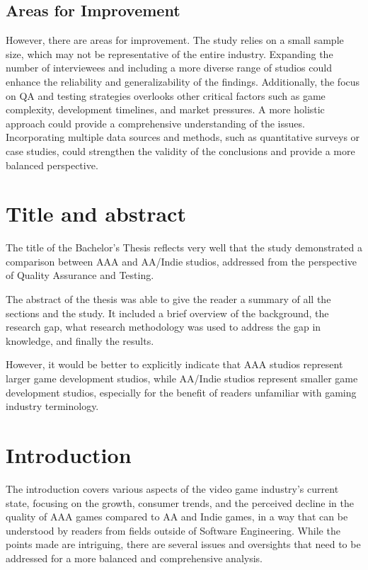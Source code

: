 \documentclass[conference]{IEEEtran}
\begin{document}
\subsection{Areas for Improvement}
However, there are areas for improvement. The study relies on a small sample size, which may not be representative of the entire industry. Expanding the number of interviewees and including a more diverse range of studios could enhance the reliability and generalizability of the findings. Additionally, the focus on QA and testing strategies overlooks other critical factors such as game complexity, development timelines, and market pressures. A more holistic approach could provide a comprehensive understanding of the issues. Incorporating multiple data sources and methods, such as quantitative surveys or case studies, could strengthen the validity of the conclusions and provide a more balanced perspective.


\section{Title and abstract}
The title of the Bachelor's Thesis reflects very well that the study demonstrated a comparison between AAA and AA/Indie studios, addressed from the perspective of Quality Assurance and Testing.

The abstract of the thesis was able to give the reader a summary of all the sections and the study. It included a brief overview of the background, the research gap, what research methodology was used to address the gap in knowledge, and finally the results.

However, it would be better to explicitly indicate that AAA studios represent larger game development studios, while AA/Indie studios represent smaller game development studios, especially for the benefit of readers unfamiliar with gaming industry terminology.


\section{Introduction}
The introduction covers various aspects of the video game industry's current state, focusing on the growth, consumer trends, and the perceived decline in the quality of AAA games compared to AA and Indie games, in a way that can be understood by readers from fields outside of Software Engineering. While the points made are intriguing, there are several issues and oversights that need to be addressed for a more balanced and comprehensive analysis.
\end{document}
